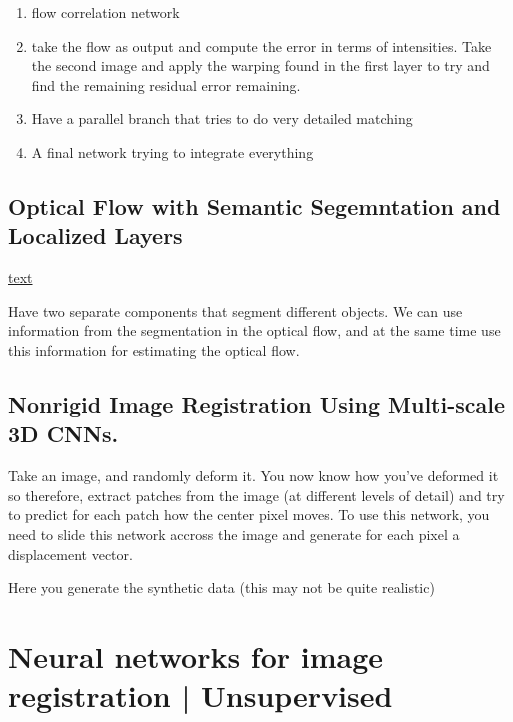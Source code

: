 \documentclass[11pt]{article}
\begin{document}
\begin{enumerate}
    \item flow correlation network
    \item take the flow as output and compute the error in terms of intensities. Take the second image and apply the warping found in the first layer to try and find the remaining residual error remaining. 
    \item Have a parallel branch that tries to do very detailed matching
    \item A final network trying to integrate everything
\end{enumerate}

\subsection{Optical Flow with Semantic Segemntation and Localized Layers}

\href{https://arxiv.org/abs/1603.03911}{text}

Have two separate components that segment different objects. We can use information from the segmentation in the optical flow, and at the same time use this information for estimating the optical flow.

\subsection{Nonrigid Image Registration Using Multi-scale 3D CNNs.}

\begin{figure}[H]
    \centering
\end{figure}

Take an image, and randomly deform it. You now know how you've deformed it so therefore, extract patches from the image (at different levels of detail) and try to predict for each patch how the center pixel moves. To use this network, you need to slide this network accross the image and generate for each pixel a displacement vector.

Here you generate the synthetic data (this may not be quite realistic)

\section{Neural networks for image registration | Unsupervised}
\end{document}
